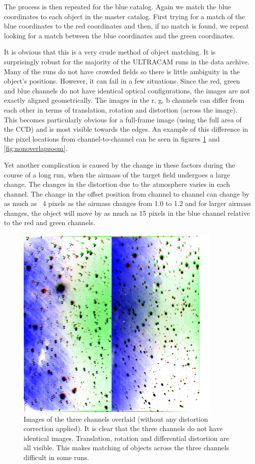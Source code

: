 The process is then repeated for the blue catalog. Again we match the blue coordinates to each object in the master catalog. First trying for a match of the blue coordinates to the red coordinates and then, if no match is found, we repeat looking for a match between the blue coordinates and the green coordinates.  

It is obvious that this is a very crude method of object matching. It is surprisingly robust for the majority of the ULTRACAM runs in the data archive. Many of the runs do not have crowded fields so there is little ambiguity in the object's positions. However, it can fail in a few situations. Since the red, green and blue channels do not have identical optical configurations, the images are not exactly aligned geometrically. The images in the r, g, b channels can differ from each other in terms of translation, rotation and distortion (across the image). This becomes particularly obvious for a full-frame image (using the full area of the CCD) and is most visible towards the edges. An example of this difference in the pixel locations from channel-to-channel can be seen in figures \ref{fig:nonoverlap} and \ref{fig:nonoverlapzoom}.

Yet another complication is caused by the change in these factors during the course of a long run, when the airmass of the target field undergoes a large change. The changes in the distortion due to the atmosphere varies in each channel. The change in the offset position from channel to channel can change by as much as ~4 pixels as the airmass changes from 1.0 to 1.2 and for larger airmass changes, the object will move by as much as 15 pixels in the blue channel relative to the red and green channels. 

\begin{figure}
  \centering
  \includegraphics[width=100mm]{images/overlay_multiply.png}
  \caption{Images of the three channels overlaid (without any distortion correction applied). It is clear that the three channels do not have identical images. Translation, rotation and differential distortion are all visible. This makes matching of objects across the three channels difficult in some runs. }
\label{fig:nonoverlap}
\end{figure}



